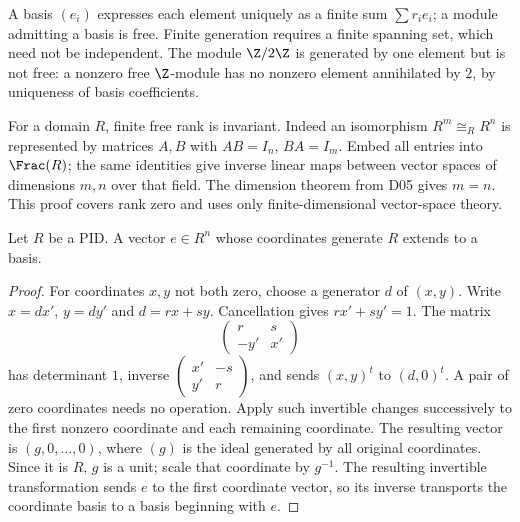 A basis $(e_i)$ expresses each element uniquely as a finite sum
$\sum r_i e_i$; a module admitting a basis is free.
Finite generation requires a finite spanning set, which need not be
independent. The module $\Z/2\Z$ is generated by one element but is
not free: a nonzero free $\Z$-module has no nonzero element annihilated
by $2$, by uniqueness of basis coefficients.

For a domain $R$, finite free rank is invariant. Indeed an isomorphism
$R^m\cong_R R^n$ is represented by matrices $A,B$ with $AB=I_n$,
$BA=I_m$. Embed all entries into $\Frac(R)$; the same identities give
inverse linear maps between vector spaces of dimensions $m,n$ over that
field. The dimension theorem from D05 gives $m=n$. This proof covers
rank zero and uses only finite-dimensional vector-space theory.

\begin{lemma}\label{lem:pid-primitive-basis}
Let $R$ be a PID. A vector $e\in R^n$ whose coordinates generate $R$
extends to a basis.
\end{lemma}
\begin{proof}
For coordinates $x,y$ not both zero, choose a generator $d$ of $(x,y)$.
Write $x=dx'$, $y=dy'$ and $d=rx+sy$. Cancellation gives
$rx'+sy'=1$. The matrix
\[
 \begin{pmatrix}r&s\\-y'&x'\end{pmatrix}
\]
has determinant $1$, inverse
$\begin{pmatrix}x'&-s\\y'&r\end{pmatrix}$, and sends
$(x,y)^t$ to $(d,0)^t$. A pair of zero coordinates needs no operation.
Apply such invertible changes successively to the first nonzero
coordinate and each remaining coordinate. The resulting vector is
$(g,0,\ldots,0)$, where $(g)$ is the ideal generated by all original
coordinates. Since it is $R$, $g$ is a unit; scale that coordinate by
$g^{-1}$. The resulting invertible transformation sends $e$ to the
first coordinate vector, so its inverse transports the coordinate basis
to a basis beginning with $e$.
\end{proof}

